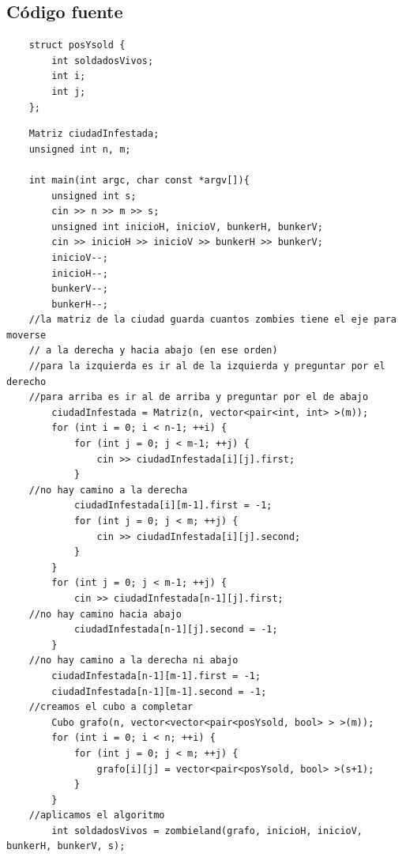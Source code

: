 \newpage

\subsection{C\'odigo fuente}
	\begin{codesnippet}
	\begin{verbatim}
    struct posYsold {
        int soldadosVivos;
        int i;
        int j;
    };
	\end{verbatim}
	\end{codesnippet}

	\begin{codesnippet}
	\begin{verbatim}
    Matriz ciudadInfestada;
    unsigned int n, m;
    
    int main(int argc, char const *argv[]){
        unsigned int s;
        cin >> n >> m >> s;
        unsigned int inicioH, inicioV, bunkerH, bunkerV;
        cin >> inicioH >> inicioV >> bunkerH >> bunkerV;
        inicioV--;
        inicioH--;
        bunkerV--;
        bunkerH--;
    //la matriz de la ciudad guarda cuantos zombies tiene el eje para moverse
    // a la derecha y hacia abajo (en ese orden)
    //para la izquierda es ir al de la izquierda y preguntar por el derecho
    //para arriba es ir al de arriba y preguntar por el de abajo
        ciudadInfestada = Matriz(n, vector<pair<int, int> >(m));
        for (int i = 0; i < n-1; ++i) {
            for (int j = 0; j < m-1; ++j) {
                cin >> ciudadInfestada[i][j].first;
            }
    //no hay camino a la derecha
            ciudadInfestada[i][m-1].first = -1;
            for (int j = 0; j < m; ++j) {
                cin >> ciudadInfestada[i][j].second;
            }
        }
        for (int j = 0; j < m-1; ++j) {
            cin >> ciudadInfestada[n-1][j].first;
    //no hay camino hacia abajo
            ciudadInfestada[n-1][j].second = -1;
        }
    //no hay camino a la derecha ni abajo
        ciudadInfestada[n-1][m-1].first = -1;
        ciudadInfestada[n-1][m-1].second = -1;
    //creamos el cubo a completar
        Cubo grafo(n, vector<vector<pair<posYsold, bool> > >(m));
        for (int i = 0; i < n; ++i) {
            for (int j = 0; j < m; ++j) {
                grafo[i][j] = vector<pair<posYsold, bool> >(s+1);
            }
        }
    //aplicamos el algoritmo
        int soldadosVivos = zombieland(grafo, inicioH, inicioV, bunkerH, bunkerV, s);
	\end{verbatim}
	\end{codesnippet}

